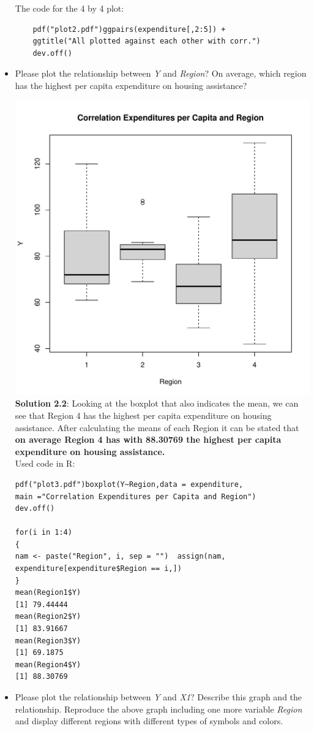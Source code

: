 \documentclass[12pt,letterpaper]{article}
\begin{document}
\begin{itemize}
The code for the 4 by 4 plot:
\begin{verbatim}
	pdf("plot2.pdf")ggpairs(expenditure[,2:5]) +  
	ggtitle("All plotted against each other with corr.")
	dev.off()
\end{verbatim}

\item
Please plot the relationship between \emph{Y} and \emph{Region}? On average, which region has the highest per capita expenditure on housing assistance?
\vspace{.5cm}

\includegraphics[width=.50\textwidth]{plot3.pdf} \\

\textbf{Solution 2.2}: Looking at the boxplot that also indicates the mean, we can see that Region 4 has the highest per capita expenditure on housing assistance. After calculating the means of each Region it can be stated that \textbf{on average Region 4 has with 88.30769 the highest per capita expenditure on housing assistance.}
\\
Used code in R:
\begin{verbatim}
pdf("plot3.pdf")boxplot(Y~Region,data = expenditure, 
main ="Correlation Expenditures per Capita and Region")
dev.off()
	
for(i in 1:4) 
{   
nam <- paste("Region", i, sep = "")  assign(nam, 
expenditure[expenditure$Region == i,])
}
mean(Region1$Y)
[1] 79.44444 
mean(Region2$Y)
[1] 83.91667
mean(Region3$Y)
[1] 69.1875
mean(Region4$Y)
[1] 88.30769
\end{verbatim}

\item
Please plot the relationship between \emph{Y} and \emph{X1}? Describe this graph and the relationship. Reproduce the above graph including one more variable \emph{Region} and display different regions with different types of symbols and colors.
\end{itemize}
\end{document}
